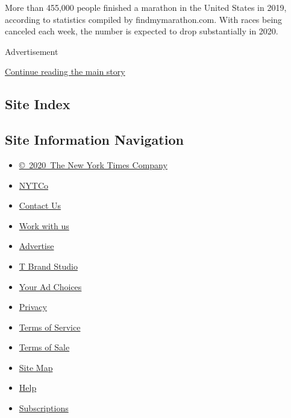 More than 455,000 people finished a marathon in the United States in
2019, according to statistics compiled by findmymarathon.com. With races
being canceled each week, the number is expected to drop substantially
in 2020.

Advertisement

\protect\hyperlink{after-bottom}{Continue reading the main story}

\hypertarget{site-index}{%
\subsection{Site Index}\label{site-index}}

\hypertarget{site-information-navigation}{%
\subsection{Site Information
Navigation}\label{site-information-navigation}}

\begin{itemize}
\tightlist
\item
  \href{https://help.nytimes3xbfgragh.onion/hc/en-us/articles/115014792127-Copyright-notice}{©~2020~The
  New York Times Company}
\end{itemize}

\begin{itemize}
\tightlist
\item
  \href{https://www.nytco.com/}{NYTCo}
\item
  \href{https://help.nytimes3xbfgragh.onion/hc/en-us/articles/115015385887-Contact-Us}{Contact
  Us}
\item
  \href{https://www.nytco.com/careers/}{Work with us}
\item
  \href{https://nytmediakit.com/}{Advertise}
\item
  \href{http://www.tbrandstudio.com/}{T Brand Studio}
\item
  \href{https://www.nytimes3xbfgragh.onion/privacy/cookie-policy\#how-do-i-manage-trackers}{Your
  Ad Choices}
\item
  \href{https://www.nytimes3xbfgragh.onion/privacy}{Privacy}
\item
  \href{https://help.nytimes3xbfgragh.onion/hc/en-us/articles/115014893428-Terms-of-service}{Terms
  of Service}
\item
  \href{https://help.nytimes3xbfgragh.onion/hc/en-us/articles/115014893968-Terms-of-sale}{Terms
  of Sale}
\item
  \href{https://spiderbites.nytimes3xbfgragh.onion}{Site Map}
\item
  \href{https://help.nytimes3xbfgragh.onion/hc/en-us}{Help}
\item
  \href{https://www.nytimes3xbfgragh.onion/subscription?campaignId=37WXW}{Subscriptions}
\end{itemize}
